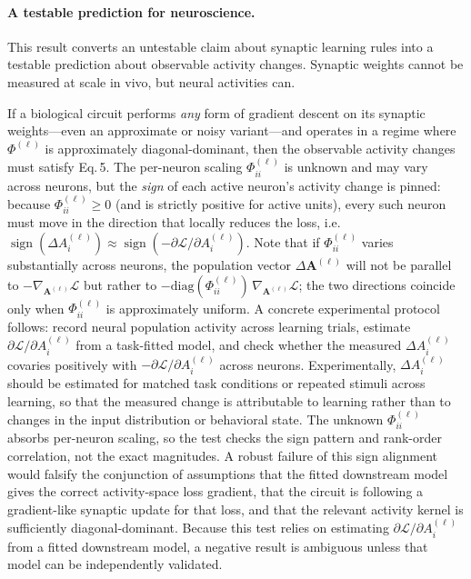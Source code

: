\documentclass[10pt]{article}
\newcommand{\vA}{\mathbf{A}}
\newcommand{\loss}{\mathcal{L}}
\begin{document}
\paragraph{A testable prediction for neuroscience.}
This result converts an untestable claim about synaptic learning rules into a testable prediction about observable activity changes.  Synaptic weights cannot be measured at scale in vivo, but neural activities can.

If a biological circuit performs \emph{any} form of gradient descent on its synaptic weights---even an approximate or noisy variant---and operates in a regime where $\Phi^{(\ell)}$ is approximately diagonal-dominant, then the observable activity changes must satisfy Eq.\,5.  The per-neuron scaling $\Phi^{(\ell)}_{ii}$ is unknown and may vary across neurons, but the \emph{sign} of each active neuron's activity change is pinned: because $\Phi^{(\ell)}_{ii}\ge 0$ (and is strictly positive for active units), every such neuron must move in the direction that locally reduces the loss, i.e.\ $\operatorname{sign}(\Delta A_i^{(\ell)}) \approx \operatorname{sign}(-\partial \loss/\partial A_i^{(\ell)})$.  Note that if $\Phi^{(\ell)}_{ii}$ varies substantially across neurons, the population vector $\Delta\vA^{(\ell)}$ will not be parallel to $-\nabla_{\!\vA^{(\ell)}}\loss$ but rather to $-\mathrm{diag}(\Phi^{(\ell)}_{ii})\,\nabla_{\!\vA^{(\ell)}}\loss$; the two directions coincide only when $\Phi^{(\ell)}_{ii}$ is approximately uniform.  A concrete experimental protocol follows: record neural population activity across learning trials, estimate $\partial \loss/\partial A_i^{(\ell)}$ from a task-fitted model, and check whether the measured $\Delta A_i^{(\ell)}$ covaries positively with $-\partial \loss/\partial A_i^{(\ell)}$ across neurons.  Experimentally, $\Delta A_i^{(\ell)}$ should be estimated for matched task conditions or repeated stimuli across learning, so that the measured change is attributable to learning rather than to changes in the input distribution or behavioral state.  The unknown $\Phi^{(\ell)}_{ii}$ absorbs per-neuron scaling, so the test checks the sign pattern and rank-order correlation, not the exact magnitudes.  A robust failure of this sign alignment would falsify the conjunction of assumptions that the fitted downstream model gives the correct activity-space loss gradient, that the circuit is following a gradient-like synaptic update for that loss, and that the relevant activity kernel is sufficiently diagonal-dominant.  Because this test relies on estimating $\partial\loss/\partial A_i^{(\ell)}$ from a fitted downstream model, a negative result is ambiguous unless that model can be independently validated.
\end{document}
